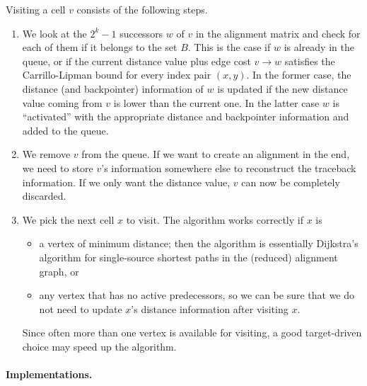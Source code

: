 {    Visiting a cell $v$ consists of the following steps.
    \begin{enumerate}
        \item We look at the $2^k-1$ successors $w$ of $v$ in the alignment matrix and check for each of them
        if it belongs to the set $B$. This is the case if $w$ is already in the queue, or if the current
        distance value plus edge cost $v\to w$ satisfies the Carrillo-Lipman bound for every index pair
        $(x,y)$. In the former case, the distance (and backpointer) information of $w$ is updated if the new
        distance value coming from $v$ is lower than the current one. In the latter case $w$ is ``activated''
        with the appropriate distance and backpointer information and added to the queue.
        \item We remove $v$ from the queue. If we want to create an alignment in the end, we need to store
        $v$'s information somewhere else to reconstruct the traceback information. If we only want the distance
        value, $v$ can now be completely discarded.
        \item We pick the next cell $x$ to visit. The algorithm works correctly if $x$ is
        \begin{itemize}
            \item a vertex of minimum distance; then the algorithm is essentially Dijkstra's algorithm for
            single-source shortest paths in the (reduced) alignment graph, or
            \item any vertex that has no active predecessors, so we can be sure that we do not need to update
            $x$'s distance information after visiting $x$.
        \end{itemize}
        Since often more than one vertex is available for visiting, a good target-driven choice may speed up
        the algorithm.
    \end{enumerate}}

\paragraph{Implementations.}



